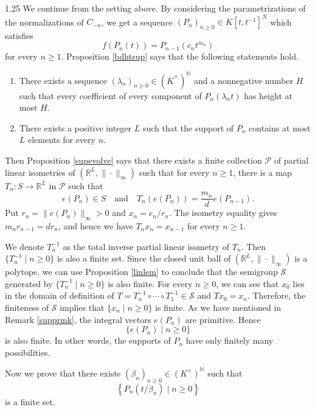\documentclass[12pt]{article}
\begin{document}
\begin{spacing}{1.25}
We continue from the setting above. By considering the parametrizations of the normalizations of $C_{-n}$, we get a sequence $(P_n)_{n\geq0}\in K[t,t^{-1}]^N$ which satisfies
$$
f(P_n(t))=P_{n-1}(c_nt^{m_n})
$$
for every $n\geq1$. Proposition \ref{bdhtsup} says that the following statements hold.
\begin{enumerate}
\item
There exists a sequence $(\lambda_n)_{n\geq0}\in(\overline{K}^{\times})^{\mathbb{N}}$ and a nonnegative number $H$ such that every coefficient of every component of $P_n(\lambda_nt)$ has height at most $H$.
\item
There exists a positive integer $L$ such that the support of $P_n$ contains at most $L$ elements for every $n$.
\end{enumerate}
Then Proposition \ref{supevolve} says that there exists a finite collection $\mathcal{P}$ of partial linear isometries of $(\mathbb{R}^L,\|\cdot\|_{\infty})$ such that for every $n\geq1$, there is a map $T_n\colon S\to\mathbb{R}^L$ in $\mathcal{P}$ such that
$$
e(P_n)\in S\quad\text{and}\quad T_n(e(P_n))=\frac{m_n}{d}e(P_{n-1}).
$$
Put $r_n=\|e(P_n)\|_{\infty}>0$ and $x_n=e_n/r_n$. The isometry equality gives $m_nr_{n-1}=dr_n$, and hence we have $T_nx_n=x_{n-1}$ for every $n\geq1$.

We denote $T_n^{-1}$ as the total inverse partial linear isometry of $T_n$. Then $\{T_n^{-1}\mid n\geq0\}$ is also a finite set. Since the closed unit ball of $(\mathbb{R}^L,\|\cdot\|_{\infty})$ is a polytope, we can use Proposition \ref{linlem} to conclude that the semigroup $\mathcal{S}$ generated by $\{T_n^{-1}\mid n\geq0\}$ is also finite. For every $n\geq0$, we can see that $x_0$ lies in the domain of definition of $T=T_n^{-1}\circ\cdots\circ T_1^{-1}\in\mathcal{S}$ and $Tx_0=x_n$. Therefore, the finiteness of $\mathcal{S}$ implies that $\{x_n\mid n\geq0\}$ is finite. As we have mentioned in Remark \ref{supprmk}, the integral vectors $e(P_n)$ are primitive. Hence
$$
\{e(P_n)\mid n\geq0\}
$$
is also finite. In other words, the supports of $P_n$ have only finitely many possibilities.

Now we prove that there exists $(\beta_n)_{n\geq0}\in(K^{\times})^{\mathbb{N}}$ such that
$$
\left\{P_n(t/\beta_n)\mid n\geq0\right\}
$$
is a finite set.


\end{spacing}
\end{document}
